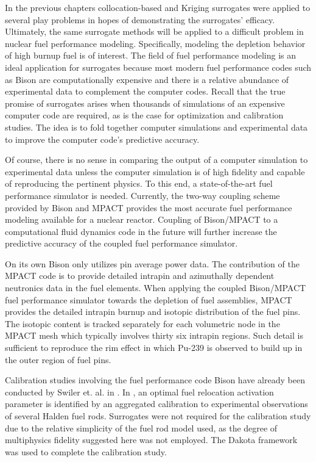 In the previous chapters collocation-based and Kriging surrogates were applied to several play problems in hopes of demonstrating the surrogates' efficacy. Ultimately, the same surrogate methods will be applied to a difficult problem in nuclear fuel performance modeling. Specifically, modeling the depletion behavior of high burnup fuel is of interest. 
The field of fuel performance modeling is an ideal application for surrogates because most modern fuel performance codes such as Bison \cite{Williamson} are computationally expensive and there is a relative abundance of experimental data to complement the computer codes. Recall that the true promise of surrogates arises when thousands of simulations of an expensive computer code are required, as is the case for optimization and calibration studies. The idea is to fold together computer simulations and experimental data to improve the computer code's predictive accuracy.    

Of course, there is no sense in comparing the output of a computer simulation to experimental data unless the computer simulation is of high fidelity and capable of reproducing the pertinent physics. To this end, a state-of-the-art fuel performance simulator is needed.   Currently, the two-way coupling scheme provided by Bison and \ac{MPACT} \cite{Kochunas} provides the most accurate fuel performance modeling available for a nuclear reactor. Coupling of Bison/\ac{MPACT} to a computational fluid dynamics code in the future will further increase the predictive accuracy of the coupled fuel performance simulator. 

On its own Bison only utilizes pin average power data. The contribution of the \ac{MPACT} code is to provide detailed intrapin and azimuthally dependent neutronics data in the fuel elements. When applying the coupled Bison/\ac{MPACT} fuel performance simulator towards the depletion of fuel assemblies, \ac{MPACT} provides the detailed intrapin burnup and isotopic distribution of the fuel pins. The isotopic content is tracked separately for each volumetric node in the \ac{MPACT} mesh which typically involves thirty six intrapin regions. Such detail is sufficient to reproduce the rim effect \cite{rim_effect} in which Pu-239 is observed to build up in the outer region of fuel pins.

Calibration studies involving the fuel performance code Bison have already been conducted by Swiler et. al. in \cite{Swiler2}. In \cite{Swiler2}, an optimal fuel relocation activation parameter is identified by an aggregated calibration to experimental observations of several Halden fuel rods. Surrogates were not required for the calibration study due to the relative simplicity of the fuel rod model used, as the degree of multiphysics fidelity suggested here was not employed. The Dakota \cite{dakota} framework was used to complete the calibration study.       

